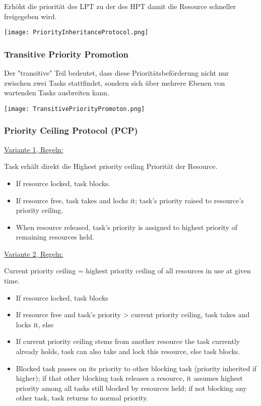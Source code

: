 Erhöht die priorität des LPT zu der des HPT damit die Resource schneller freigegeben wird.

\texttt{[image: PriorityInheritanceProtocol.png]}

\subsubsection{Transitive Priority Promotion}

Der "transitive" Teil bedeutet, dass diese Prioritätsbeförderung nicht nur zwischen zwei Tasks stattfindet, sondern sich über mehrere Ebenen von wartenden Tasks ausbreiten kann.

\texttt{[image: TransitivePriorityPromoton.png]}

\subsubsection{Priority Ceiling Protocol (PCP)}

\underline{Variante 1, Regeln:}

Task erhält direkt die Highest priority ceiling Priorität der Resource.

\begin{itemize}
    \itemsep-.5em 
    \item If resource locked, task blocks.
    \item If resource free, task takes and locks it; task's priority raised to resource's priority ceiling.
    \item When resource released, task's priority is assigned to highest priority of remaining resources held.
\end{itemize}

\underline{Variante 2, Regeln:}

Current priority ceiling = highest priority ceiling of all resources in use at given time.

\begin{itemize}
    \itemsep-.5em 
    \item If resource locked, task blocks
    \item If resource free and task's priority > current priority ceiling, task takes and locks it, else
    \item If current priority ceiling stems from another resource the task currently already holds, task can also take and lock this resource, else task blocks.
    \item Blocked task passes on its priority to other blocking task (priority inherited if higher); if that other blocking task releases a resource, it assumes highest priority among all tasks still blocked by resources held; if not blocking any other task, task returns to normal priority.
\end{itemize}


